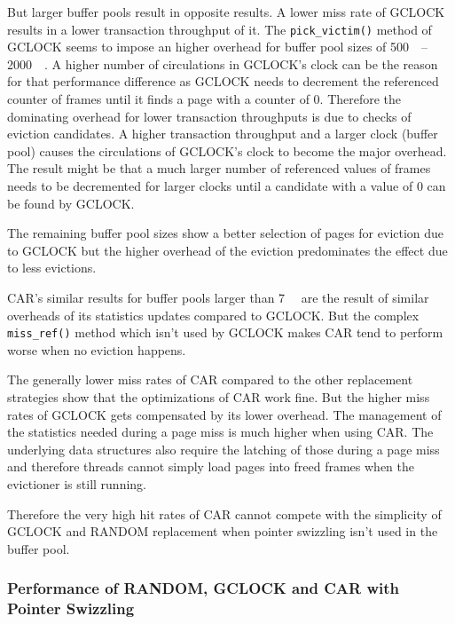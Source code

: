	But larger buffer pools result in opposite results. A lower miss rate of GCLOCK results in a lower transaction throughput of it. The \lstinline{pick_victim()} method of GCLOCK seems to impose an higher overhead for buffer pool sizes of \SIrange{500}{2000}{\mebi\byte}. A higher number of circulations in GCLOCK's clock can be the reason for that performance difference as GCLOCK needs to decrement the referenced counter of frames until it finds a page with a counter of \num{0}. Therefore the dominating overhead for lower transaction throughputs is due to checks of eviction candidates. A higher transaction throughput and a larger clock (buffer pool) causes the circulations of GCLOCK's clock to become the major overhead. The result might be that a much larger number of referenced values of frames needs to be decremented for larger clocks until a candidate with a value of \num{0} can be found by GCLOCK.
	
	The remaining buffer pool sizes show a better selection of pages for eviction due to GCLOCK but the higher overhead of the eviction predominates the effect due to less evictions.
	
	CAR's similar results for buffer pools larger than \SI{7}{\gibi\byte} are the result of similar overheads of its statistics updates compared to GCLOCK. But the complex \lstinline{miss_ref()} method which isn't used by GCLOCK makes CAR tend to perform worse when no eviction happens.
	
	The generally lower miss rates of CAR compared to the other replacement strategies show that the optimizations of CAR work fine. But the higher miss rates of GCLOCK gets compensated by its lower overhead. The management of the statistics needed during a page miss is much higher when using CAR. The underlying data structures also require the latching of those during a page miss and therefore threads cannot simply load pages into freed frames when the evictioner is still running.
	
	Therefore the very high hit rates of CAR cannot compete with the simplicity of GCLOCK and RANDOM replacement when pointer swizzling isn't used in the buffer pool.
	
\subsubsection{Performance of RANDOM, GCLOCK and CAR with Pointer Swizzling}

